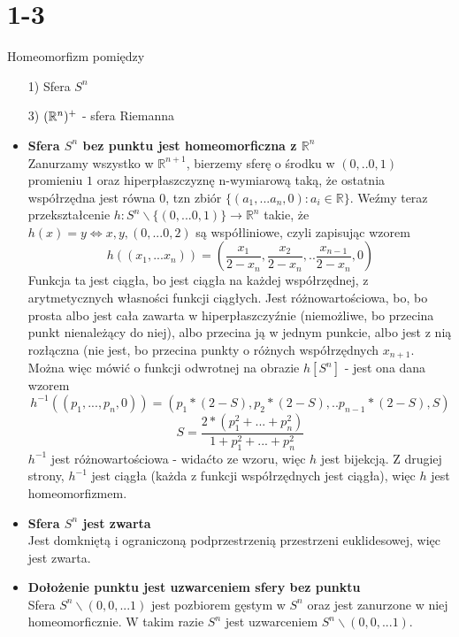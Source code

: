 \section*{1-3}
Homeomorfizm pomiędzy
\begin{itemize}
  \item[1)] Sfera $S^n$
  \item[3)] $({\mathbb{R}}^n)^+$ - sfera Riemanna
\end{itemize}
\begin{itemize}
\item \textbf{Sfera $S^n$ bez punktu jest homeomorficzna z $\mathbb{R}^n$}\\
Zanurzamy wszystko w $\mathbb{R}^{n+1}$, bierzemy sferę o środku w $(0, .. 0, 1)$ promieniu $1$ oraz hiperpłaszczyznę n-wymiarową taką, że ostatnia współrzędna jest równa $0$, tzn zbiór $\{(a_1, ... a_n, 0): a_i \in \mathbb{R}\}$.
Weźmy teraz przekształcenie $h: S^n \backslash \{(0, ... 0, 1)\} \rightarrow \mathbb{R}^n$ takie, że $h(x) = y \iff x, y, (0, ... 0, 2)$ są współliniowe, czyli zapisując wzorem
$$
h((x_1, ... x_n)) = (\frac{x_1}{2-x_n}, \frac{x_2}{2-x_n}, .. \frac{x_{n-1}}{2-x_n}, 0)
$$
Funkcja ta jest ciągła, bo jest ciągła na każdej współrzędnej, z arytmetycznych własności funkcji ciągłych.
Jest różnowartościowa, bo, bo prosta albo jest cała zawarta w hiperpłaszczyźnie (niemożliwe, bo przecina punkt nienależący do niej), albo przecina ją w jednym punkcie, albo jest z nią rozłączna (nie jest, bo przecina punkty o różnych współrzędnych $x_{n+1}$.
Można więc mówić o funkcji odwrotnej na obrazie $h[S^n]$ - jest ona dana wzorem
$$
h^{-1}((p_1, ... , p_n, 0)) = (p_1 * (2-S), p_2*(2-S), .. p_{n-1} * (2-S), S)
$$
$$
S = \frac{2*(p_1^2 + ... + p_n^2)}{1 + p_1^2 + ... + p_n^2}
$$
$h^{-1}$ jest różnowartościowa - widaćto ze wzoru, więc $h$ jest bijekcją.
Z drugiej strony, $h^{-1}$ jest ciągła (każda z funkcji współrzędnych jest ciągła), więc $h$ jest homeomorfizmem.

\item \textbf{Sfera $S^n$ jest zwarta}\\
Jest domkniętą i ograniczoną podprzestrzenią przestrzeni euklidesowej, więc jest zwarta.

\item \textbf{Dołożenie punktu jest uzwarceniem sfery bez punktu}\\
Sfera $S^n \backslash (0, 0, ... 1)$ jest pozbiorem gęstym w $S^n$ oraz jest zanurzone w niej homeomorficznie. W takim razie $S^n$ jest uzwarceniem $S^n \backslash (0, 0, ... 1)$.


\end{itemize}
